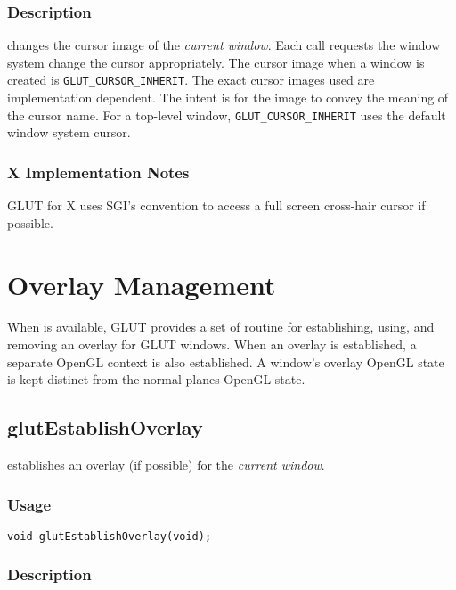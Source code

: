 \subsubsection*{Description}

 changes the cursor image of the {\em current window}.
Each call requests the window system change the cursor appropriately.
The cursor image when a window is created is {\tt GLUT\_CURSOR\_INHERIT}.
The exact cursor images used are implementation dependent.  The intent is
for the image to convey the meaning of the cursor name.
For a top-level window, {\tt GLUT\_CURSOR\_INHERIT} uses the default window
system cursor.

\subsubsection*{X Implementation Notes}

GLUT for X uses SGI's  convention
\cite{kilgard93-xsgi} to access a full screen cross-hair cursor if possible.

\section{Overlay Management}

When  is available, GLUT provides a set of routine for
establishing, using, and removing an overlay for GLUT windows.
When an overlay is established, a separate OpenGL context is also
established.  A window's overlay OpenGL state is kept 
distinct from the normal planes OpenGL state.

\subsection{glutEstablishOverlay}

 establishes an overlay (if possible) for
the {\em current window}.

\subsubsection*{Usage}

\begin{verbatim}
void glutEstablishOverlay(void);
\end{verbatim}

\subsubsection*{Description}

